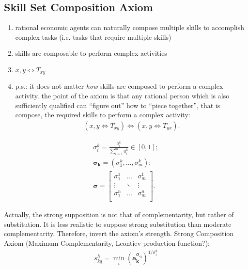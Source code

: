 \documentclass{elsarticle} %
\begin{document}
\subsection{Skill Set Composition Axiom}
\begin{enumerate}
    \item rational economic agents can naturally compose multiple skills to accomplish
          complex tasks (i.e. tasks that require multiple skills)
    \item skills are composable to perform complex activities
    \item $x,y \iff T_{xy}$
    \item p.s.: it does not matter \textit{how} skills are composed to perform a complex
          activity. the point of the axiom is that any rational person which is also
          sufficiently qualified can ``figure out'' how to ``piece together'', that is
          compose, the required skills to perform a complex activity:
          \begin{gather*}
              (x,y \iff T_{xy}) \iff (x,y \iff T_{yx})
              .
          \end{gather*}
\end{enumerate}

\begin{gather*}
    \sigma_{i}^{k} = 
    \frac{
        a_{i}^{k}
        }{
            \sum_{i=1}^{m}{
                a_{i}^{k}
            }
        }
        \in [0,1]
        ;\\
    \boldsymbol{\sigma_{k}} = 
    (\sigma_{1}^{k}, \dots, \sigma_{m}^{k})
    ;\\
    \boldsymbol{\sigma} =
    \begin{bmatrix}
        \sigma_{1}^{1} & \hdots & \sigma_{m}^{1} \\
        \vdots    & \ddots & \vdots    \\
        \sigma_{1}^{n} & \hdots & \sigma_{m}^{n} \\
    \end{bmatrix}
    .
\end{gather*}

Actually, the strong supposition is not that of complementarity, but rather of substitution. It is less realistic to suppose strong substitution than moderate complementarity. Therefore, invert the axiom's strength.
Strong Composition Axiom (Maximum Complementarity, Leontiev production function?):
\begin{gather*}
    s_{kq}^{h} = 
    {\min_{i}\left(
        {\boldsymbol{a_{k}^ {\boldsymbol{\sigma_{q}}}}}
    \right)} ^ {1 / \sigma_{i}^{q}}
\end{gather*}
\end{document}
